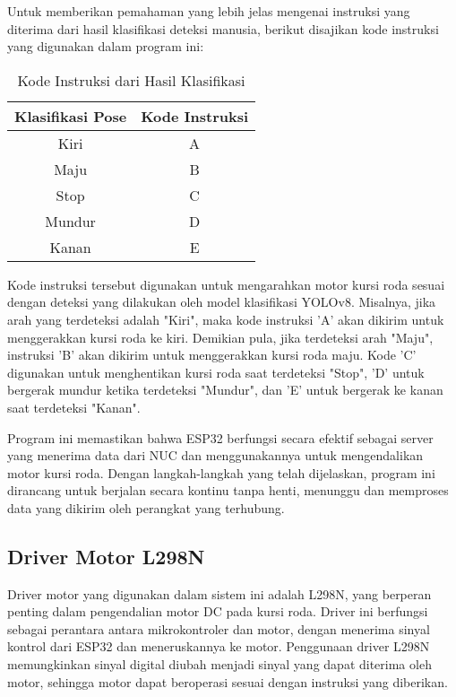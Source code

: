 Untuk memberikan pemahaman yang lebih jelas mengenai instruksi yang diterima dari hasil klasifikasi deteksi manusia, berikut disajikan kode instruksi yang digunakan dalam program ini:
\begin{table}[H]
\centering
\caption{Kode Instruksi dari Hasil Klasifikasi}
\begin{tabular}{|c|c|}
\hline
\textbf{Klasifikasi Pose} & \textbf{Kode Instruksi} \\
\hline
Kiri & A \\
\hline
Maju & B \\
\hline
Stop & C \\
\hline
Mundur & D \\
\hline
Kanan & E \\
\hline
\end{tabular}
\end{table}

Kode instruksi tersebut digunakan untuk mengarahkan motor kursi roda sesuai dengan deteksi yang dilakukan oleh model klasifikasi YOLOv8. Misalnya, jika arah yang terdeteksi adalah "Kiri", maka kode instruksi 'A' akan dikirim untuk menggerakkan kursi roda ke kiri. Demikian pula, jika terdeteksi arah "Maju", instruksi 'B' akan dikirim untuk menggerakkan kursi roda maju. Kode 'C' digunakan untuk menghentikan kursi roda saat terdeteksi "Stop", 'D' untuk bergerak mundur ketika terdeteksi "Mundur", dan 'E' untuk bergerak ke kanan saat terdeteksi "Kanan".

Program ini memastikan bahwa ESP32 berfungsi secara efektif sebagai server yang menerima data dari NUC dan menggunakannya untuk mengendalikan motor kursi roda. Dengan langkah-langkah yang telah dijelaskan, program ini dirancang untuk berjalan secara kontinu tanpa henti, menunggu dan memproses data yang dikirim oleh perangkat yang terhubung.

\subsection{Driver Motor L298N}
\label{subsec:drivermotor}
Driver motor yang digunakan dalam sistem ini adalah L298N, yang berperan penting dalam pengendalian motor DC pada kursi roda. Driver ini berfungsi sebagai perantara antara mikrokontroler dan motor, dengan menerima sinyal kontrol dari ESP32 dan meneruskannya ke motor. Penggunaan driver L298N memungkinkan sinyal digital diubah menjadi sinyal yang dapat diterima oleh motor, sehingga motor dapat beroperasi sesuai dengan instruksi yang diberikan.

